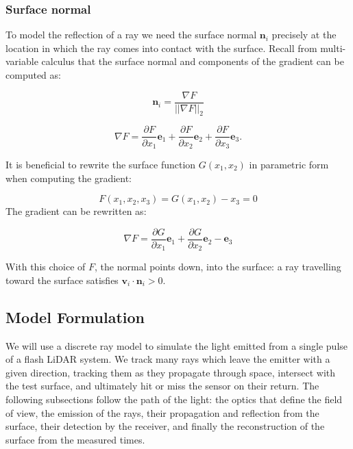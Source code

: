 \documentclass[../../me144_244_student.tex]{subfiles}
\begin{document}
\subsubsection*{Surface normal}

To model the reflection of a ray we need the surface normal $\boldsymbol{n}_i$ precisely at the
location in which the ray comes into contact with the surface. Recall from multi-variable calculus
that the surface normal and components of the gradient can be computed as:

\vspace{0.1 in}
\begin{equation}
    \boldsymbol{n}_i = \frac{\nabla F}{||\nabla F||_2}
\end{equation}

\begin{equation}
    \nabla F = \frac{\partial F}{\partial x_1} \boldsymbol{e}_1 + \frac{\partial F}{\partial x_2} \boldsymbol{e}_2 + \frac{\partial F}{\partial x_3}\boldsymbol{e}_3.
\end{equation}
\vspace{0.1 in}

It is beneficial to rewrite the surface function $G(x_1, x_2)$ in parametric form when computing the
gradient:

\vspace{0.1in}
\begin{equation}
    F(x_1, x_2, x_3) = G(x_1, x_2) - x_3 = 0
\end{equation}
\vspace{0.2in}
The gradient can be rewritten as:

\vspace{0.1 in}
\begin{equation}\label{gradF}
    \nabla F = \frac{\partial G}{\partial x_1} \boldsymbol{e}_1 + \frac{\partial G}{\partial x_2} \boldsymbol{e}_2 - \boldsymbol{e}_3
\end{equation}
\vspace{0.1in}

With this choice of $F$, the normal points down, into the surface: a ray travelling toward the
surface satisfies $\boldsymbol{v}_i \cdot \boldsymbol{n}_i > 0$.

\subsection*{Model Formulation}

We will use a discrete ray model to simulate the light emitted from a single pulse of a flash LiDAR
system. We track many rays which leave the emitter with a given direction, tracking them as they
propagate through space, intersect with the test surface, and ultimately hit or miss the sensor on
their return. The following subsections follow the path of the light: the optics that define the
field of view, the emission of the rays, their propagation and reflection from the surface, their
detection by the receiver, and finally the reconstruction of the surface from the measured times.
\end{document}
